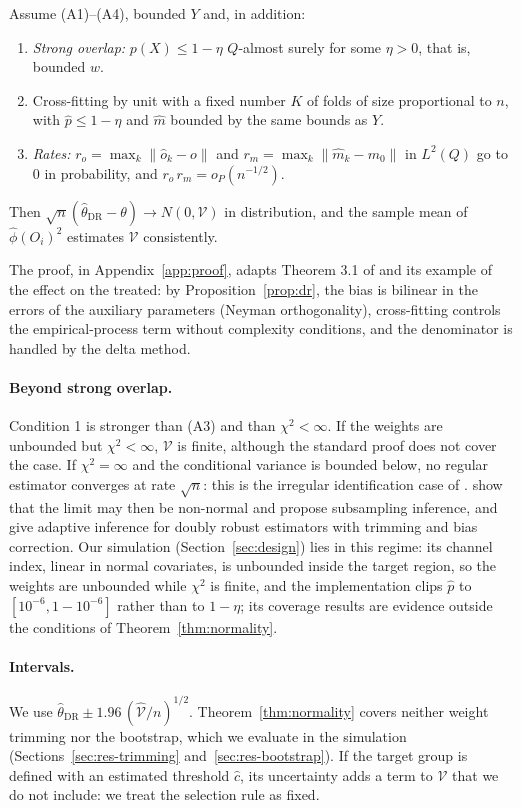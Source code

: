 \begin{theorem}\label{thm:normality}
Assume (A1)--(A4), bounded $Y$ and, in addition:
\begin{enumerate}
  \item \emph{Strong overlap:} $p(X)\le1-\eta$ $Q$-almost surely for some $\eta>0$, that is, bounded $w$.
  \item Cross-fitting by unit with a fixed number $K$ of folds of size proportional to $n$, with $\hat p\le1-\eta$ and $\hat m$ bounded by the same bounds as $Y$.
  \item \emph{Rates:} $r_o=\max_k\|\hat o_k-o\|$ and $r_m=\max_k\|\hat m_k-m_0\|$ in $L^2(Q)$ go to 0 in probability, and $r_o\,r_m=o_P(n^{-1/2})$.
\end{enumerate}
Then $\sqrt n(\hat\theta_{\mathrm{DR}}-\theta)\to N(0,\mathcal V)$ in distribution, and the sample mean of $\hat\phi(O_i)^2$ estimates $\mathcal V$ consistently.
\end{theorem}
The proof, in Appendix~\ref{app:proof}, adapts Theorem 3.1 of \citet{chernozhukov2018} and its example of the effect on the treated: by Proposition~\ref{prop:dr}, the bias is bilinear in the errors of the auxiliary parameters (Neyman orthogonality), cross-fitting controls the empirical-process term without complexity conditions, and the denominator is handled by the delta method.

\paragraph{Beyond strong overlap.} Condition 1 is stronger than (A3) and than $\chi^2<\infty$. If the weights are unbounded but $\chi^2<\infty$, $\mathcal V$ is finite, although the standard proof does not cover the case. If $\chi^2=\infty$ and the conditional variance is bounded below, no regular estimator converges at rate $\sqrt n$: this is the irregular identification case of \citet{khan2010}. \citet{ma2020} show that the limit may then be non-normal and propose subsampling inference, and \citet{ma2023} give adaptive inference for doubly robust estimators with trimming and bias correction. Our simulation (Section~\ref{sec:design}) lies in this regime: its channel index, linear in normal covariates, is unbounded inside the target region, so the weights are unbounded while $\chi^2$ is finite, and the implementation clips $\hat p$ to $[10^{-6},1-10^{-6}]$ rather than to $1-\eta$; its coverage results are evidence outside the conditions of Theorem~\ref{thm:normality}.

\paragraph{Intervals.} We use $\hat\theta_{\mathrm{DR}}\pm1.96\,(\hat{\mathcal V}/n)^{1/2}$. Theorem~\ref{thm:normality} covers neither weight trimming nor the bootstrap, which we evaluate in the simulation (Sections~\ref{sec:res-trimming} and~\ref{sec:res-bootstrap}). If the target group is defined with an estimated threshold $\hat c$, its uncertainty adds a term to $\mathcal V$ that we do not include: we treat the selection rule as fixed.
